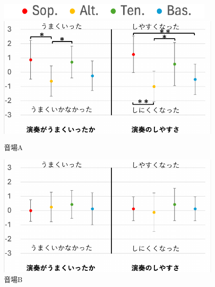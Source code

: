 \documentclass[11pt,a4j]{jreport}
\begin{document}
  
  \begin{figure}[H]
    \centering
    
    \begin{minipage}{1\linewidth}
      \centering
      \includegraphics[scale=.55]{images/subjectiveExp/statisticAnalysis/part_legend.pdf}
    \end{minipage}

    \vspace{.5\baselineskip}

    \begin{minipage}{.5\linewidth}
      \centering
      \includegraphics[scale=.55]{images/subjectiveExp/statisticAnalysis/part_overall_a.pdf}
      \caption*{音場A}
      \label{fig:総合的な評価A}
    \end{minipage}%
    \begin{minipage}{.5\linewidth}
      \centering
      \includegraphics[scale=.55]{images/subjectiveExp/statisticAnalysis/part_overall_b.pdf}
      \caption*{音場B}
      \label{fig:総合的な評価B}
    \end{minipage}


\end{figure}
\end{document}
